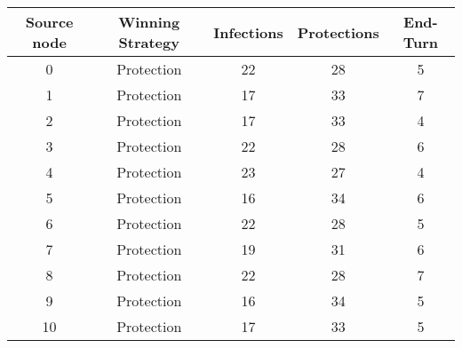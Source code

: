 \documentclass[results.tex]{subfiles}
\begin{document}
    \begin{center}
        \begin{tabular}{| c || c | c | c | c |}
            \hline
            {\bfseries Source node} & {\bfseries Winning Strategy} & {\bfseries Infections} & {\bfseries Protections}
            & {\bfseries End-Turn}
            \\  %
            \hline\hline
            0                       & Protection                   & 22                     & 28                      & 5                    \\
            \hline
            1                       & Protection                   & 17                     & 33                      & 7                    \\
            \hline
            2                       & Protection                   & 17                     & 33                      & 4                    \\
            \hline
            3                       & Protection                   & 22                     & 28                      & 6                    \\
            \hline
            4                       & Protection                   & 23                     & 27                      & 4                    \\
            \hline
            5                       & Protection                   & 16                     & 34                      & 6                    \\
            \hline
            6                       & Protection                   & 22                     & 28                      & 5                    \\
            \hline
            7                       & Protection                   & 19                     & 31                      & 6                    \\
            \hline
            8                       & Protection                   & 22                     & 28                      & 7                    \\
            \hline
            9                       & Protection                   & 16                     & 34                      & 5                    \\
            \hline
            10                      & Protection                   & 17                     & 33                      & 5                    \\

\end{tabular}
\end{center}
\end{document}
